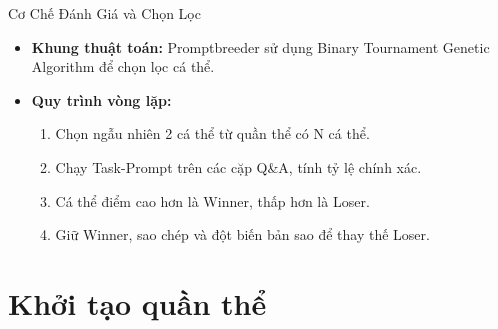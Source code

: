 \documentclass[english,main=vietnamese,xcolor=table]{beamer}
\begin{document}
\begin{frame}{Cơ Chế Đánh Giá và Chọn Lọc}

\begin{itemize}
    \setlength{\itemsep}{8pt}

    \item \textbf{Khung thuật toán:}  Promptbreeder sử dụng Binary Tournament Genetic Algorithm để chọn lọc cá thể.

    \item \textbf{Quy trình vòng lặp:}
    \begin{enumerate}
        \item  Chọn ngẫu nhiên 2 cá thể từ quần thể có N cá thể.
        \item  Chạy Task-Prompt trên các cặp Q\&A, tính tỷ lệ chính xác.
        \item  Cá thể điểm cao hơn là Winner, thấp hơn là Loser.
        \item  Giữ Winner, sao chép và đột biến bản sao để thay thế Loser.
    \end{enumerate}
\end{itemize}

\end{frame}

\section{Khởi tạo quần thể}
\end{document}
